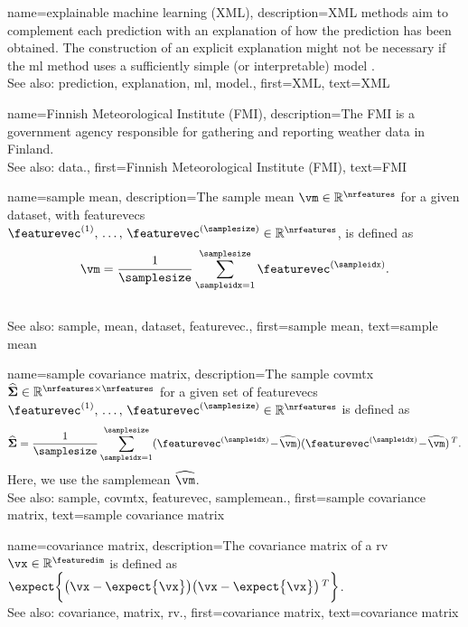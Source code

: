 {name={explainable machine learning (XML)}, 
	description={XML 
		methods aim to complement each \gls{prediction} with an \gls{explanation} of 
		how the \gls{prediction} has been obtained. The construction of an explicit \gls{explanation} 
		might not be necessary if the \gls{ml} method uses a sufficiently simple (or interpretable) \gls{model} \cite{rudin2019stop}.
				\\
		See also: \gls{prediction}, \gls{explanation}, \gls{ml}, \gls{model}.},
	first={XML},
	text={XML} 
}

{name={Finnish Meteorological Institute (FMI)}, 
	description={The
		FMI is a government agency responsible for gathering 
		and reporting weather \gls{data} in Finland.
				\\
		See also: \gls{data}.},
	first={Finnish Meteorological Institute (FMI)},
	text={FMI} 
}
	
	
{name={sample mean}, 
	description={The \gls{sample} \gls{mean} 
		$\vm \in \mathbb{R}^{\nrfeatures}$ for a given \gls{dataset}, with \glspl{featurevec} 
		$\featurevec^{(1)}, \,\ldots, \,\featurevec^{(\samplesize)} \in \mathbb{R}^{\nrfeatures}$, is defined as 
		$$\vm = \frac{1}{\samplesize} \sum_{\sampleidx=1}^{\samplesize} \featurevec^{(\sampleidx)}.$$ 
					\\
		See also: \gls{sample}, \gls{mean}, \gls{dataset}, \gls{featurevec}.},
	first={sample mean},
	text={sample mean} 
}

	
{name={sample covariance matrix}, 
	description={The 
		\gls{sample} \gls{covmtx} $\widehat{\bf \Sigma} \in \mathbb{R}^{\nrfeatures \times \nrfeatures}$ 
		for a given set of \glspl{featurevec} $\featurevec^{(1)}, \,\ldots, \,\featurevec^{(\samplesize)} \in \mathbb{R}^{\nrfeatures}$ is defined as 
		$$\widehat{\bf \Sigma} = \frac{1}{\samplesize} \sum_{\sampleidx=1}^{\samplesize} (\featurevec^{(\sampleidx)}\!-\!\widehat{\vm}) (\featurevec^{(\sampleidx)}\!-\!\widehat{\vm})\,^{T}.$$ 
		Here, we use the \gls{samplemean} $\widehat{\vm}$. 
				\\
		See also: \gls{sample}, \gls{covmtx}, \gls{featurevec}, \gls{samplemean}.},
	first={sample covariance matrix},
	text={sample covariance matrix} 
}

{name={covariance matrix}, 
	description={The \gls{covariance} \gls{matrix} of a \gls{rv} $\vx \in \mathbb{R}^{\featuredim}$ 
		is defined as $\expect \bigg \{ \big( \vx - \expect \big\{ \vx \big\} \big)  \big(\vx - \expect \big\{ \vx \big\} \big)\,^{T} \bigg\}$.
				\\
		See also: \gls{covariance}, \gls{matrix}, \gls{rv}.},
	first={covariance matrix},
	text={covariance matrix} 
}
	
